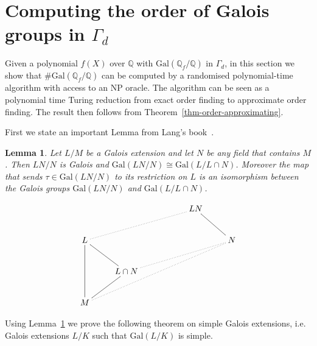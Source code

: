 \documentclass[11pt]{madras}%
\newtheorem{lemma}[theorem]{Lemma}
\theoremstyle{remark}
\newcommand{\Gal}[1]{{\ensuremath{\mathrm{Gal}\left(#1\right)}}}
\begin{document}
\section{Computing the order of Galois groups in $\Gamma_d$}

Given a polynomial $f(X)$ over $\mathbb{Q}$ with
$\Gal{\mathbb{Q}_f/\mathbb{Q}}$ in $\Gamma_d$, in this section we show
that $\#\Gal{\mathbb{Q}_f/\mathbb{Q}}$ can be computed by a randomised
polynomial-time algorithm with access to an $\mathrm{NP}$ oracle.  The
algorithm can be seen as a polynomial time Turing reduction from exact
order finding to approximate order finding. The result then follows
from Theorem~\ref{thm-order-approximating}.

First we state an important Lemma from Lang's book~\cite[Chapter VI,
Theorem 1.12]{lang:algebra}.

\begin{lemma}\label{lem-lang}
  Let $L/M$ be a Galois extension and let $N$ be any field that
  contains $M$. Then $LN/N$ is Galois and $\Gal{LN/N} \cong \Gal{L/L
    \cap N}$. Moreover the map that sends $\tau \in \Gal{LN/N}$ to its
  restriction on $L$ is an isomorphism between the Galois groups
  $\Gal{LN/N}$ and $\Gal{L/L \cap N}$.
\end{lemma}
\[
\xymatrix{ & & & LN \\ L \ar@{.}[urrr]& & & & N \ar@{-}[ul]\\ & L \cap
  N \ar@{.}[urrr] \ar@{-}[ul]\\ M \ar@{-}[uu] \ar@{.}[uurrrr]
  \ar@{-}[ur]\\ }
\]

Using Lemma~\ref{lem-lang} we prove the following theorem on simple
Galois extensions, i.e. Galois extensions $L/K$ such that $\Gal{L/K}$
is simple.
\end{document}
